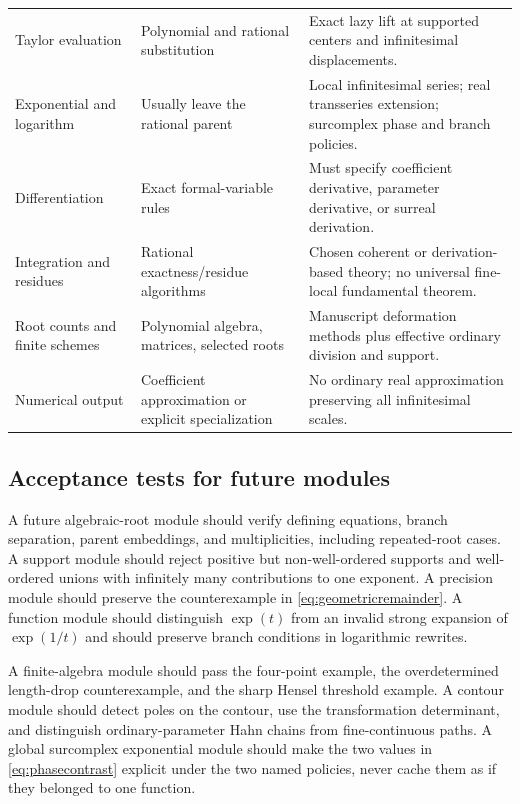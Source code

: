 \documentclass[11pt,letterpaper]{article}
\theoremstyle{definition}\newtheorem{definition}[theorem]{Definition}
\theoremstyle{remark}\newtheorem{remark}[theorem]{Remark}
\numberwithin{equation}{section}\setcounter{tocdepth}{2}
\begin{document}
\begin{center}
\begin{longtable}{@{}L{0.27\textwidth}L{0.31\textwidth}L{0.33\textwidth}@{}}
Taylor evaluation & Polynomial and rational substitution & Exact lazy lift at supported centers and infinitesimal displacements.\\[0.4em]
Exponential and logarithm & Usually leave the rational parent & Local infinitesimal series; real transseries extension; surcomplex phase and branch policies.\\[0.4em]
Differentiation & Exact formal-variable rules & Must specify coefficient derivative, parameter derivative, or surreal derivation.\\[0.4em]
Integration and residues & Rational exactness/residue algorithms & Chosen coherent or derivation-based theory; no universal fine-local fundamental theorem.\\[0.4em]
Root counts and finite schemes & Polynomial algebra, matrices, selected roots & Manuscript deformation methods plus effective ordinary division and support.\\[0.4em]
Numerical output & Coefficient approximation or explicit specialization & No ordinary real approximation preserving all infinitesimal scales.\\
\bottomrule
\end{longtable}\end{center}

\subsection{Acceptance tests for future modules}
A future algebraic-root module should verify defining equations, branch separation, parent embeddings, and multiplicities, including repeated-root cases. A support module should reject positive but non-well-ordered supports and well-ordered unions with infinitely many contributions to one exponent. A precision module should preserve the counterexample in \eqref{eq:geometricremainder}. A function module should distinguish $\exp(t)$ from an invalid strong expansion of $\exp(1/t)$ and should preserve branch conditions in logarithmic rewrites.

A finite-algebra module should pass the four-point example, the overdetermined length-drop counterexample, and the sharp Hensel threshold example. A contour module should detect poles on the contour, use the transformation determinant, and distinguish ordinary-parameter Hahn chains from fine-continuous paths. A global surcomplex exponential module should make the two values in \eqref{eq:phasecontrast} explicit under the two named policies, never cache them as if they belonged to one function.
\end{document}
